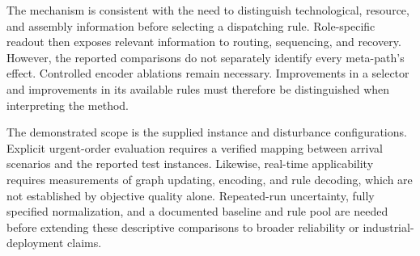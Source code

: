 
The mechanism is consistent with the need to distinguish technological, resource,
and assembly information before selecting a dispatching rule. Role-specific readout then exposes
relevant information to routing, sequencing, and recovery. However, the reported comparisons do not separately identify every meta-path's effect. Controlled encoder ablations remain necessary. Improvements in a selector and improvements in its available
rules must therefore be distinguished when interpreting the method.


The demonstrated scope is the supplied instance and disturbance configurations. Explicit urgent-order
evaluation requires a verified mapping between arrival scenarios and the reported test instances.
Likewise, real-time applicability requires measurements of graph updating, encoding, and rule decoding,
which are not established by objective quality alone. Repeated-run uncertainty, fully specified normalization,
and a documented baseline and rule pool are needed before extending these descriptive comparisons
to broader reliability or industrial-deployment claims.

